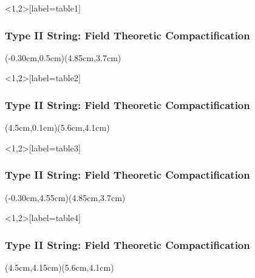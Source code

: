 \begin{frame}<1,2>[label=table1]
	\frametitle<1,2>{Type II String: Field Theoretic Compactification}
	(-0.30cm,0.5cm)(4.85cm,3.7cm)
	\begin{table}[c]
		\vspace{-0.2cm}
		\scalebox{0.63}{
			
		}
	\end{table}
\end{frame}

\begin{frame}<1,2>[label=table2]
	\frametitle<1,2>{Type II String: Field Theoretic Compactification}
	(4.5cm,0.1cm)(5.6cm,4.1cm)
	\begin{table}[c]
		\vspace{-0.2cm}
		\scalebox{0.63}{
			
		}
	\end{table}
\end{frame}

\begin{frame}<1,2>[label=table3]
	\frametitle<1,2>{Type II String: Field Theoretic Compactification}
	(-0.30cm,4.55cm)(4.85cm,3.7cm)
	\begin{table}[c]
		\vspace{-0.2cm}
		\scalebox{0.63}{
			
		}
	\end{table}
\end{frame}

\begin{frame}<1,2>[label=table4]
	\frametitle<1,2>{Type II String: Field Theoretic Compactification}
	(4.5cm,4.15cm)(5.6cm,4.1cm)
	\begin{table}[c]
		\vspace{-0.2cm}
		\scalebox{0.63}{
			
		}
	\end{table}
\end{frame}
